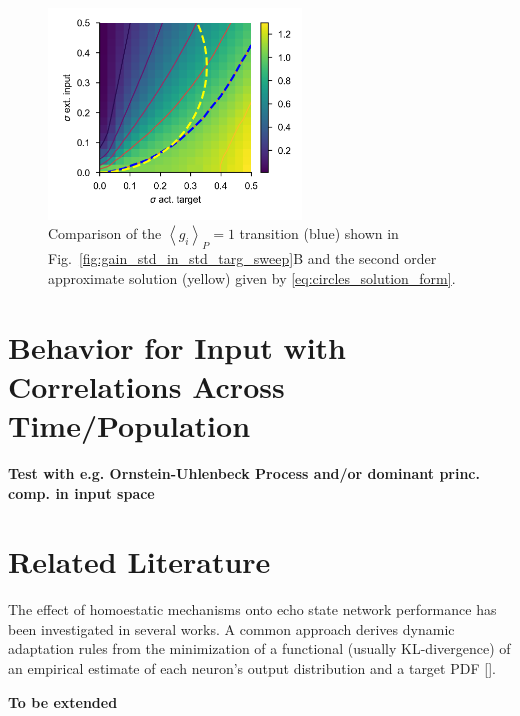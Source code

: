 \documentclass[10pt,a4paper]{article}
\newcommand{\avgp}[1]{\left< #1 \right>_P}
\begin{document}
\begin{figure}
	\centering
	\includegraphics[width=0.6\textwidth]{../plots/crit_transition_2nd_order_approx.png}
	\caption{Comparison of the $\avgp{g_i} = 1$ transition (blue) shown in Fig.~\ref{fig:gain_std_in_std_targ_sweep}B and the second order approximate solution (yellow) given by \eqref{eq:circles_solution_form}. }
	\label{fig:crit_transition_2nd_order_approx}
\end{figure}

\section{Behavior for Input with Correlations Across Time/Population}

{\bf Test with e.g. Ornstein-Uhlenbeck Process and/or dominant princ. comp. in input space}

\section{Related Literature}

The effect of homoestatic mechanisms onto echo state network performance has been investigated in several works. A common approach derives dynamic adaptation rules from the minimization of a functional (usually KL-divergence) of an empirical estimate of each neuron's output distribution and a target PDF [\cite{Triesch_2007, Schrauwen_2008, Boedecker_2009}].

{\bf To be extended}



\end{document}
